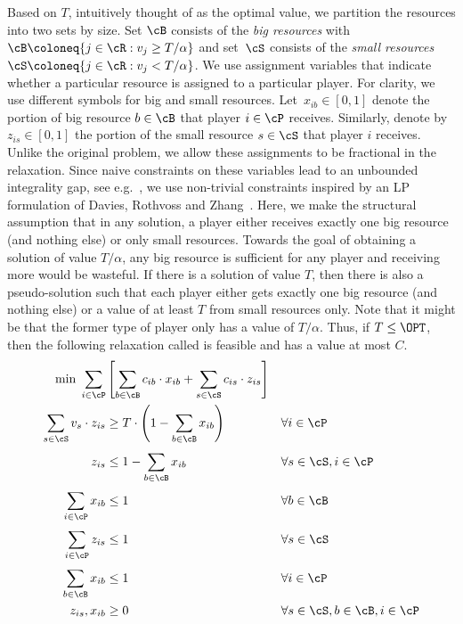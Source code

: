 Based on $T$, intuitively thought of as the optimal value, we partition the resources into two sets by size. Set $\cB$ consists of the \emph{big resources} with $\cB \coloneq \{ j \in \cR : v_j \geq T/\alpha\}$ and set~$\cS$ consists of the \emph{small resources} $\cS \coloneq \{ j \in \cR : v_j < T/\alpha\}$.
We use assignment variables that indicate whether a particular
resource is assigned to a particular player. For clarity,
we use different symbols for big and small resources.
Let~$x_{ib} \in [0,1]$ denote the portion of big resource $b \in \cB$ that player $i \in  \cP$ receives. Similarly, denote by $z_{is} \in [0,1]$ the portion of the small resource $s \in \cS$ that player $i$ receives.
Unlike the original problem, we allow these
assignments to be fractional in the relaxation.
Since naive constraints on these variables lead to an unbounded integrality gap, see e.g.~\cite{BansalS06}, we use
non-trivial constraints inspired by an LP formulation of Davies, Rothvoss and Zhang~\cite{DaviesRZ20}. Here, we make the structural
assumption that in any solution, a player either receives exactly
one big resource (and nothing else) or only small resources.
Towards the goal of obtaining a solution of value $T/\alpha$,
any big resource is sufficient for any player and receiving more
would be wasteful.
If there is a solution of value $T$, then there is also
a pseudo-solution such that each player either gets exactly one big
resource (and nothing else) or a value of at least $T$ from
small resources only. Note that it might be that the former
type of player only has a value of $T/\alpha$. Thus, if $T \le \OPT$, then the following relaxation called 
is feasible and has a value at most $C$.
\begin{align}
    \min \; \sum_{i \in \cP}^{} &\left[\sum_{b \in \cB}^{}c_{ib}\cdot x_{ib} + \sum_{s \in \cS}^{}c_{is}\cdot z_{is} \right]  && \label{eq:economical-objective-function} \\
    \sum_{s \in \cS} v_{s}\cdot z_{is} &\geq T \cdot \left(1 - \sum_{b \in \cB} x_{ib}\right) &&\forall i \in \cP \label{eq:economical-value} \\
    z_{is} &\leq 1 - \sum_{b \in \cB}^{} x_{ib} &&\forall s \in \cS, i \in \cP \label{eq:economical-small-gifts} \\
    \sum_{i \in \cP}^{} x_{ib} &\leq 1 &&\forall b \in \cB \label{eq:economical-ub-player} \\
    \sum_{i \in \cP}^{} z_{is} &\leq 1 &&\forall s \in \cS \label{eq:economical-ub-z} \\
    \sum_{b \in \cB}^{} x_{ib} &\leq 1 &&\forall i \in \cP \label{eq:economical-ub-big-gifts} \\
    z_{is}, x_{ib}  &\geq 0 &&\forall s \in \cS, b \in \cB, i \in \cP \label{eq:economical-nonneg-x}
\end{align}


